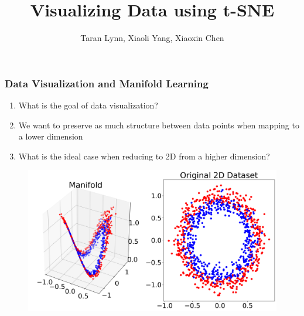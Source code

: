 \documentclass{beamer}
\title{Visualizing Data using t-SNE}
\author{Taran Lynn, Xiaoli Yang, Xiaoxin Chen}
\begin{document}
\maketitle

\begin{frame}
  \frametitle{Data Visualization and Manifold Learning}

  \begin{enumerate}
  \item What is the goal of data visualization?

    \pause

  \item We want to preserve as much structure between data points when
    mapping to a lower dimension

  \item What is the ideal case when reducing to 2D from a higher dimension?
  \end{enumerate}

  \pause

  \begin{figure}
    \centering
    \includegraphics[height=0.5\textheight]{images/manifold/manifold.png}
  \end{figure}
\end{frame}
\end{document}
